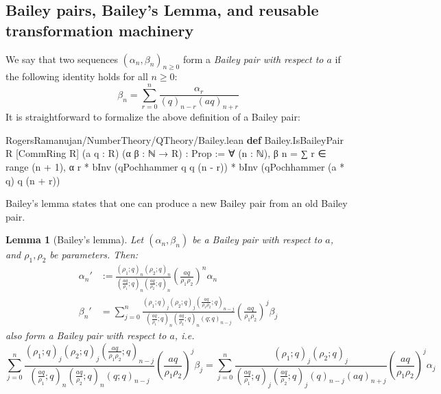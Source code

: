 \documentclass[12pt]{amsart}
\newtheorem{lemma}[theorem]{Lemma}
\theoremstyle{definition}
\theoremstyle{remark}
\numberwithin{equation}{subsection}
\newcommand{\kw}[1]{\textcolor{keywordcolor}{\textbf{#1}}}
\newcommand{\var}[1]{\textcolor{tacticcolor}{#1}}
\newcommand{\num}[1]{\textcolor{numcolor}{#1}}
\newcommand{\imp}[1]{\textcolor{commentcolor}{\textbraceleft#1\textbraceright}}
\begin{document}
\subsection{Bailey pairs, Bailey's Lemma, and reusable transformation machinery}

We say that two sequences $(\alpha_n, \beta_n)_{n \ge 0}$ form a \emph{Bailey pair with respect to $a$} if the following identity holds for all $n \ge 0$:
\begin{equation}
    \beta_n = \sum_{r=0}^{n} \frac{\alpha_r}{(q)_{n-r} (aq)_{n+r}}
\end{equation}
It is straightforward to formalize the above definition of a Bailey pair:

\begin{code}{RogersRamanujan/NumberTheory/QTheory/Bailey.lean}
\kw{def} Bailey.IsBaileyPair \imp{R} [CommRing \var{R}] (\var{a} \var{q} : \var{R}) (\var{α} \var{β} : ℕ → \var{R}) : Prop :=
  ∀ (\var{n} : ℕ),
    \var{β} \var{n} = ∑ \var{r} ∈ range (\var{n} + \num{1}),
      \var{α} \var{r} * bInv (qPochhammer \var{q} \var{q} (\var{n} - \var{r})) * bInv (qPochhammer (\var{a} * \var{q}) \var{q} (\var{n} + \var{r}))
\end{code}

Bailey's lemma states that one can produce a new Bailey pair from an old Bailey pair. 

\begin{lemma}[Bailey's lemma]
\label{lem:q-bailey}
Let $(\alpha_n, \beta_n)$ be a Bailey pair with respect to $a$, and $\rho_1, \rho_2$ be parameters. Then:
\begin{align}
    \alpha_n' &:= \frac{(\rho_1;q)_n (\rho_2;q)_n }{(\frac{aq}{\rho_1};q)_n (\frac{aq}{\rho_2};q)_n}\left(\frac{aq}{\rho_1\rho_2}\right)^n \alpha_n \label{eqn:bailey-alphaprime} \\
    \beta_n' &= \sum_{j=0}^{n} \frac{(\rho_1;q)_j (\rho_2;q)_j \left(\frac{aq}{\rho_1\rho_2};q\right)_{n-j}}{(\frac{aq}{\rho_1};q)_n (\frac{aq}{\rho_2};q)_n (q;q)_{n-j}} \left(\frac{aq}{\rho_1\rho_2}\right)^j \beta_j \label{eqn:bailey-betaprime}
\end{align}
also form a Bailey pair with respect to $a$, i.e.
\begin{equation}
    \sum_{j=0}^{n} \frac{(\rho_1;q)_j (\rho_2;q)_j \left(\frac{aq}{\rho_1\rho_2};q\right)_{n-j}}{(\frac{aq}{\rho_1};q)_n (\frac{aq}{\rho_2};q)_n (q;q)_{n-j}} \left(\frac{aq}{\rho_1\rho_2}\right)^j \beta_j = \sum_{j=0}^{n} \frac{(\rho_1;q)_j (\rho_2;q)_j}{(\frac{aq}{\rho_1};q)_j (\frac{aq}{\rho_2};q)_j (q)_{n-j}(aq)_{n+j}}\left(\frac{aq}{\rho_1\rho_2}\right)^j \alpha_j
\end{equation}
\end{lemma}
\end{document}
